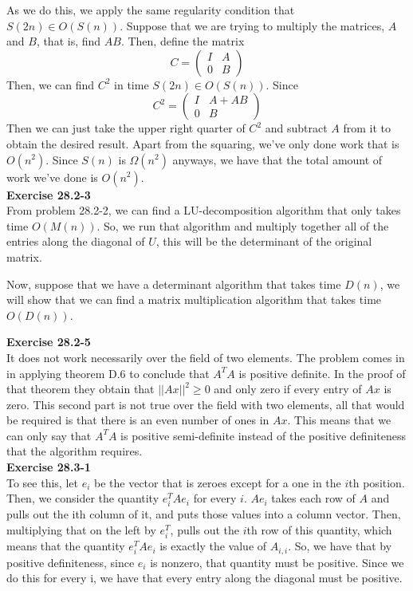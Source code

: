 \documentclass{article}
\begin{document}
As we do this, we apply the same regularity condition that $S(2n)\in O(S(n))$. Suppose that we are trying to multiply the matrices, $A$ and $B$, that is, find $AB$. Then, define the matrix 
\[
C = \left( \begin{array}{cc}I&A\\0&B\end{array}\right)
\]
Then, we can find $C^2$ in time $S(2n) \in O(S(n))$. Since 
\[
C^2 = \left( \begin{array}{cc}I&A+AB\\0&B\end{array}\right)
\]
Then we can just take the upper right quarter of $C^2$ and subtract $A$ from it to obtain the desired result. Apart from the squaring, we've only done work that is $O(n^2)$. Since $S(n)$ is $\Omega(n^2)$ anyways, we have that the total amount of work we've done is $O(n^2)$.\\

\noindent\textbf{Exercise 28.2-3}\\
From problem 28.2-2, we can find a LU-decomposition algorithm that only takes time $O(M(n))$. So, we run that algorithm and multiply together all of the entries along the diagonal of $U$, this will be the determinant of the original matrix.

Now, suppose that we have a determinant algorithm that takes time $D(n)$, we will show that we can find a matrix multiplication algorithm that takes time $O(D(n))$.

\noindent\textbf{Exercise 28.2-5}\\
It does not work necessarily over the field of two elements. The problem comes in in applying theorem D.6 to conclude that $A^TA$ is positive definite. In the proof of that theorem they obtain that $||Ax||^2 \ge 0$ and only zero if every entry of $Ax$ is zero. This second part is not true over the field with two elements, all that would be required is that there is an even number of ones in $Ax$. This means that we can only say that $A^TA$ is positive semi-definite instead of the positive definiteness that the algorithm requires.\\

\noindent\textbf{Exercise 28.3-1}\\
To see this, let $e_i$ be the vector that is zeroes except for a one in the $i$th position. Then, we consider the quantity $e_i^TAe_i$ for every $i$. $Ae_i$ takes each row of $A$ and pulls out the ith column of it, and puts those values into a column vector. Then, multiplying that on the left by $e_i^T$, pulls out the $i$th row of this quantity, which means that the quantity $e_i^TAe_i$ is exactly the value of $A_{i,i}$. So, we have that by positive definiteness, since $e_i$ is nonzero, that quantity must be positive. Since we do this for every i, we have that every entry along the diagonal must be positive.\\
\end{document}
